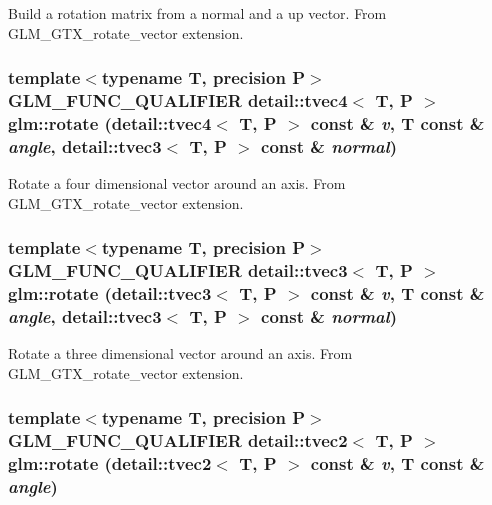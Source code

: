 Build a rotation matrix from a normal and a up vector. From GLM\_\-GTX\_\-rotate\_\-vector extension. \hypertarget{group__gtx__rotate__vector_ga787e2132208a47efe58640ac7de9509}{
\subsubsection[rotate]{\setlength{\rightskip}{0pt plus 5cm}template$<$typename T, precision P$>$ GLM\_\-FUNC\_\-QUALIFIER detail::tvec4$<$ T, P $>$ glm::rotate (detail::tvec4$<$ T, P $>$ const \& {\em v}, \/  T const \& {\em angle}, \/  detail::tvec3$<$ T, P $>$ const \& {\em normal})}}
\label{group__gtx__rotate__vector_ga787e2132208a47efe58640ac7de9509}


Rotate a four dimensional vector around an axis. From GLM\_\-GTX\_\-rotate\_\-vector extension. \hypertarget{group__gtx__rotate__vector_gf0809ae83e84fc9880b4c8b7093c349c}{
\subsubsection[rotate]{\setlength{\rightskip}{0pt plus 5cm}template$<$typename T, precision P$>$ GLM\_\-FUNC\_\-QUALIFIER detail::tvec3$<$ T, P $>$ glm::rotate (detail::tvec3$<$ T, P $>$ const \& {\em v}, \/  T const \& {\em angle}, \/  detail::tvec3$<$ T, P $>$ const \& {\em normal})}}
\label{group__gtx__rotate__vector_gf0809ae83e84fc9880b4c8b7093c349c}


Rotate a three dimensional vector around an axis. From GLM\_\-GTX\_\-rotate\_\-vector extension. \hypertarget{group__gtx__rotate__vector_gc1ec422e7ac679e3332b381e88d29dfd}{
\subsubsection[rotate]{\setlength{\rightskip}{0pt plus 5cm}template$<$typename T, precision P$>$ GLM\_\-FUNC\_\-QUALIFIER detail::tvec2$<$ T, P $>$ glm::rotate (detail::tvec2$<$ T, P $>$ const \& {\em v}, \/  T const \& {\em angle})}}
\label{group__gtx__rotate__vector_gc1ec422e7ac679e3332b381e88d29dfd}


